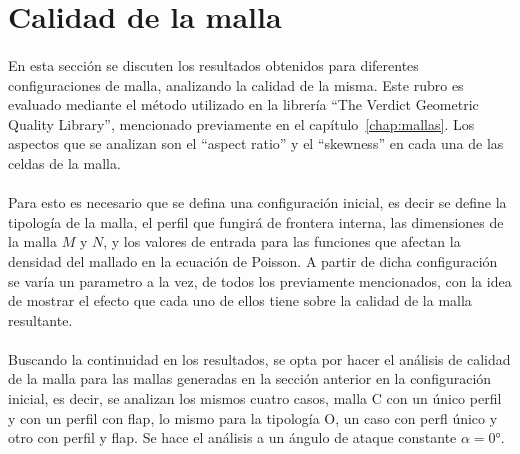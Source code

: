 \documentclass[letterpaper, openright, 12pt]{book}
\begin{document}
    \section{Calidad de la malla}
    \paragraph*{}
    En esta sección se discuten los resultados obtenidos para diferentes
    configuraciones de malla, analizando la calidad de la misma. Este
    rubro es evaluado mediante el método utilizado en la librería ``The
    Verdict Geometric Quality Library'', mencionado previamente en el
    capítulo~\ref{chap:mallas}. Los aspectos que se analizan son el
    ``aspect ratio'' y el ``skewness'' en cada una de las celdas de la malla.

    \paragraph*{}
    Para esto es necesario que se defina una configuración inicial, es decir
    se define la tipología de la malla, el perfil que fungirá de frontera
    interna, las dimensiones de la malla $M$ y $N$, y los valores de entrada
    para las funciones que afectan la densidad del mallado en la ecuación de
    Poisson. A partir de dicha configuración se varía un parametro a la vez,
    de todos los previamente mencionados, con la idea de mostrar el efecto que
    cada uno de ellos tiene sobre la calidad de la malla resultante.

    \paragraph*{}
    Buscando la continuidad en los resultados, se opta por hacer el análisis 
    de calidad de la malla para las mallas generadas en la sección anterior
    en la configuración inicial, es decir, se analizan los mismos cuatro
    casos, malla C con un único perfil y con un perfil con flap, lo mismo
    para la tipología O, un caso con perfl único y otro con perfil y flap.
    Se hace el análisis a un ángulo de ataque constante
    $\alpha = 0\si{\degree}$.
\end{document}
